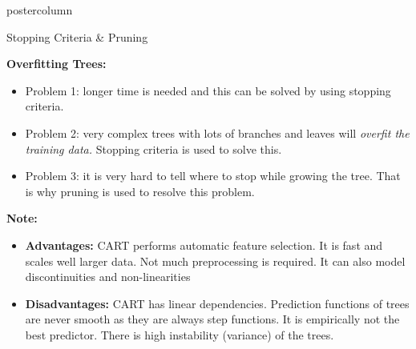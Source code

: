 \documentclass{beamer}
\begin{document}
\begin{frame}[fragile]{}
\begin{columns}
\begin{column}{.31\textwidth}
\begin{beamercolorbox}[center]{postercolumn}
\begin{minipage}{.98\textwidth}
{  \begin{myblock}{Stopping Criteria \& Pruning}
  \begin{codebox} \textbf{Overfitting Trees: }	
  \end{codebox}
  
  \begin{itemize}[$\bullet$]     
  \setlength{\itemindent}{+.3in}
  \item Problem 1: longer time is needed and this can be solved by using stopping criteria.
  \item Problem 2: very complex trees with lots of branches and leaves will \emph{overfit the training data.} Stopping criteria is used to solve this.
  \item Problem 3: it is very hard to tell where to stop while growing the tree. That is why pruning is used to resolve this problem.
  \end{itemize}
  
  \begin{codebox}
  \textbf{Note: }
  \end{codebox}
  
  \begin{itemize}[$\bullet$]     
  \setlength{\itemindent}{+.3in}
  \item \textbf{Advantages: }CART performs automatic feature selection. It is fast and scales well larger data. Not much preprocessing is required. It can also model discontinuities and non-linearities
  \item \textbf{Disadvantages: }CART has linear dependencies. Prediction functions of trees are never smooth as they are always step functions. It is empirically not the best predictor. There is high instability (variance) of the trees. 
  \end{itemize}
  \end{myblock}
  }
  
  \end{minipage}
  \end{beamercolorbox}
  \end{column}
  
  
  
\end{columns}
\end{frame}
\end{document}
